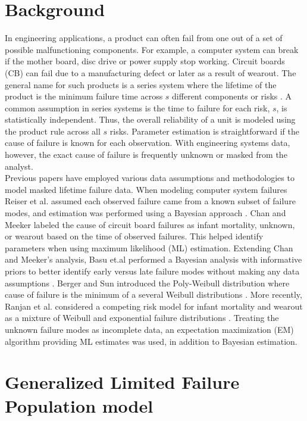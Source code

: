 \documentclass[12pt]{article}
\begin{document}
\section{Background}
\label{sec:Background}
In engineering applications, a product can often fail from one out of a set of possible malfunctioning components.  For example, a computer system can break if the mother board, disc drive or power supply stop working.  Circuit boards (CB) can fail due to a manufacturing defect or later as a result of wearout.  The general name for such products is a series system where the lifetime of the product is the minimum failure time across $s$ different components or risks \cite{nelson}.  A common assumption in series systems is the time to failure for each risk, $s$, is statistically independent.  Thus, the overall reliability of a unit is modeled using the product rule across all $s$ risks.  Parameter estimation is straightforward if the cause of failure is known for each observation.  With engineering systems data, however, the exact cause of failure is frequently unknown or masked from the analyst.  \\

Previous papers have employed various data assumptions and methodologies to model masked lifetime failure data.  When modeling computer system failures Reiser et al. assumed each observed failure came from a known subset of failure modes, and estimation was performed using a Bayesian approach \cite{reiser}.  Chan and Meeker labeled the cause of circuit board failures as infant mortality, unknown, or wearout based on the time of observed failures.  This helped identify parameters when using maximum likelihood (ML) estimation.  Extending Chan and Meeker's analysis, Basu et.al performed a Bayesian analysis with informative priors to better identify early versus late failure modes without making any data assumptions \cite{basu}.  Berger and Sun introduced the Poly-Weibull distribution where cause of failure is the minimum of a several Weibull distributions \cite{berger}.  More recently, Ranjan et al. considered a competing risk model for infant mortality and wearout as a mixture of Weibull and exponential failure distributions \cite{ranjan}.  Treating the unknown failure modes as incomplete data, an expectation maximization (EM) algorithm providing ML estimates was used, in addition to Bayesian estimation.


\section{Generalized Limited Failure Population model}
\label{sec:GLFP model}
\end{document}
